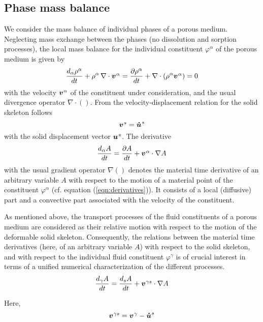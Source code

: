 \subsection{Phase mass balance}

We consider the mass balance of individual phases of a porous medium.
%
Neglecting mass exchange between the phases (no dissolution and sorption processes), the local mass balance for the individual constituent $\varphi^{\alpha}$ of the porous medium is given by
\begin{equation}
\frac{d_{\alpha}\rho^{\alpha}}{dt}+\rho^{\alpha}\,\nabla\cdot\mio{v}{\alpha}{}=
\frac{\partial\rho^{\alpha}}{dt}+\nabla\cdot\left(\rho^{\alpha}\mio{v}{\alpha}{}\right)=0
\label{eq14}
\end{equation}
with the velocity $\mbox{${\mbox{\boldmath${v}$\unboldmath}}^{\:\!\alpha}$}$ of the constituent under consideration, and the usual divergence operator $\nabla\cdot()$. From the velocity-displacement relation for the solid skeleton follows
\begin{equation}
\mio{v}{s}{}=\mio{u}{s}{\dot}
\label{eq15}
\end{equation}
with the solid displacement vector $\mbox{${\mbox{\boldmath${u}$\unboldmath}}^{\:\!s}$}$. The derivative
\begin{equation}
\frac{d_{\alpha}A}{dt}=\frac{\partial A}{dt}+\mio{v}{\alpha}{}\cdot\nabla A
\label{eq16}
\end{equation}
with the usual gradient operator $\nabla()$ denotes the material time derivative of an arbitrary variable $A$ with respect to the motion of a material point of the constituent $\varphi^{\alpha}$ (cf. equation (\ref{eqn:derivatives})). It consists of a local (diffusive) part and a convective part associated with the velocity of the constituent.

As mentioned above, the transport processes of the fluid constituents of a porous medium are considered as their relative motion with respect to the motion of the deformable solid skeleton. Consequently, the relations between the material time derivatives (here, of an arbitrary variable $A$) with respect to the solid skeleton, and with respect to the individual fluid constituent $\varphi^{\gamma}$ is of crucial interest in terms of a unified numerical characterization of the different processes.
\begin{equation}
\frac{d_{\gamma}A}{dt}=\frac{d_{s}A}{dt}+\mio{v}{\gamma s}{}\cdot\nabla A
\label{eq17}
\end{equation}

Here, 
\begin{equation}
\mbox{${\mbox{\boldmath${v}$\unboldmath}}^{\:\!\gamma s}$}=\mbox{${\mbox{\boldmath${v}$\unboldmath}}^{\:\!\gamma}$}-\mbox{${\mbox{\boldmath$\dot{u}$\unboldmath}}^{\:\!s}$}
\end{equation}

